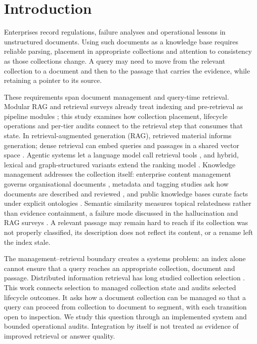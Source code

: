 \section{Introduction}
\label{sec:intro}

Enterprises record regulations, failure analyses and operational lessons in
unstructured documents. Using such documents as a knowledge base requires
reliable parsing, placement in appropriate collections and attention to
consistency as those collections change.
A query may need to move from the relevant collection to a document and then
to the passage that carries the evidence, while retaining a pointer to its
source.

These requirements span document management and query-time retrieval.
Modular RAG and retrieval surveys already treat indexing and pre-retrieval as
pipeline modules \cite{modular-rag,gao-ragsurvey}; this study examines how
collection placement, lifecycle operations and per-tier audits connect to the
retrieval step that consumes that state. In retrieval-augmented generation
(RAG), retrieved material informs generation; dense retrieval can embed queries
and passages in a shared vector space \cite{rag-lewis,dpr}. Agentic systems let a language
model call retrieval tools \cite{mcp,singh-agentic-rag}, and hybrid, lexical
and graph-structured variants extend the ranking model
\cite{bm25,rrf-cormack,graphrag,lightrag,raptor}. Knowledge management
addresses the collection itself: enterprise content management governs
organisational documents \cite{paivarinta-ecm-2005,tyrvaainen-ecm-2006},
metadata and tagging studies ask how documents are described and reviewed
\cite{park-metadata-quality-2009,golder-tagging-2006}, and public knowledge
bases curate facts under explicit ontologies
\cite{auer-dbpedia-kb-2007,hoffart-yago2-kb-2013}. Semantic similarity
measures topical relatedness rather than evidence containment, a failure mode
discussed in the hallucination and RAG surveys \cite{siren,gao-ragsurvey}.
A relevant passage may remain hard to reach if its collection was not
properly classified, its description does not reflect its content, or a
rename left the index stale.

The management--retrieval boundary creates a systems problem: an index alone
cannot ensure that a query reaches an appropriate collection, document and
passage. Distributed information retrieval has long studied collection
selection \cite{callan1995searching,si2003redde}. This work connects selection
to managed collection state and audits selected lifecycle outcomes. It asks how
a document collection can be managed so that a query can proceed from
collection to document to segment, with each transition open to inspection.
We study this question through an implemented system and bounded operational
audits. Integration by itself is not treated as evidence of improved retrieval
or answer quality.

